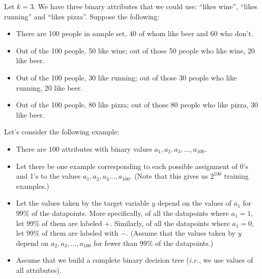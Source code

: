 Let $k = 3$. We have three binary attributes that we could use: ``likes wine'', ``likes running'' and ``likes pizza''.  Suppose the following:
\begin{itemize}
	\item There are 100 people in sample set, 40 of whom like beer and 60 who don't.
	\item Out of the 100 people, 50 like wine; out of those 50 people who like wine, 20 like beer.
	\item Out of the 100 people, 30 like running; out of those 30 people who like running, 20 like beer.
	\item Out of the 100 people, 80 like pizza; out of those 80 people who like pizza, 30 like beer.
	\end{itemize}


Let's consider the following example:
\begin{itemize}
\item There are $100$ attributes with binary values $a_1, a_2, a_3, \ldots, a_{100}$.
\item Let there be one example corresponding to each possible assignment of 0's and 1's to the values $a_1, a_2, a_3 \ldots, a_{100}$. (Note that this gives us $2^{100}$ training examples.)
\item Let the values taken by the target variable $y$ depend on the values of $a_1$ for $99 \%$ of the datapoints. More specifically, of all the datapoints where $a_1=1$, let $99 \%$ of them are labeled $+$. Similarly, of all the datapoints where $a_1 = 0$, let $99 \%$ of them are labeled with $-$.  (Assume that the values taken by $y$ depend on $a_2, a_3, \dots, a_{100}$ for fewer than $99\%$ of the datapoints.)
\item Assume that we build a complete binary decision tree (\emph{i.e.}, we use values of all attributes).
\end{itemize}



